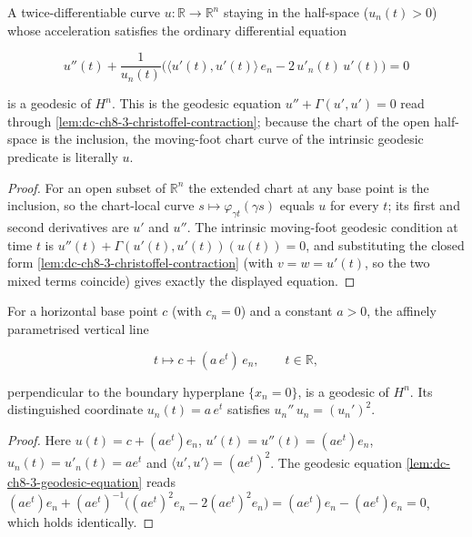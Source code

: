 \begin{lemma}
  \label{lem:dc-ch8-3-geodesic-equation}
  \leanok
  A twice-differentiable curve $u:\mathbb R\to\mathbb R^n$ staying in the
  half-space ($u_n(t)>0$) whose acceleration satisfies the ordinary differential
  equation

  $$
  u''(t)+\frac{1}{u_n(t)}\Big(\langle u'(t),u'(t)\rangle\, e_n-2\,u'_n(t)\,u'(t)\Big)=0
  $$

  is a geodesic of $H^n$. This is the geodesic equation $u''+\Gamma(u',u')=0$ read
  through \cref{lem:dc-ch8-3-christoffel-contraction}; because the chart of the open
  half-space is the inclusion, the moving-foot chart curve of the intrinsic geodesic
  predicate is literally $u$.
\end{lemma}
\begin{proof}
  \leanok
\sketch
  For an open subset of $\mathbb R^n$ the extended chart at any base point is the
  inclusion, so the chart-local curve $s\mapsto\varphi_{\gamma t}(\gamma s)$ equals
  $u$ for every $t$; its first and second derivatives are $u'$ and $u''$. The
  intrinsic moving-foot geodesic condition at time $t$ is
  $u''(t)+\Gamma(u'(t),u'(t))(u(t))=0$, and substituting the closed form
  \cref{lem:dc-ch8-3-christoffel-contraction} (with $v=w=u'(t)$, so the two mixed
  terms coincide) gives exactly the displayed equation.
\end{proof}

\begin{lemma}
  \label{lem:dc-ch8-3-vertical-geodesic}
  \leanok
  For a horizontal base point $c$ (with $c_n=0$) and a constant $a>0$, the affinely
  parametrised vertical line

  $$
  t\longmapsto c+(a\,e^{t})\,e_n,\qquad t\in\mathbb R,
  $$

  perpendicular to the boundary hyperplane $\{x_n=0\}$, is a geodesic of $H^n$. Its
  distinguished coordinate $u_n(t)=a\,e^{t}$ satisfies $u_n''\,u_n=(u_n')^2$.
\end{lemma}
\begin{proof}
  \leanok
\sketch
  Here $u(t)=c+(a e^{t})e_n$, $u'(t)=u''(t)=(a e^{t})e_n$, $u_n(t)=u'_n(t)=a e^{t}$
  and $\langle u',u'\rangle=(a e^{t})^2$. The geodesic equation
  \cref{lem:dc-ch8-3-geodesic-equation} reads
  $(a e^{t})e_n+(a e^{t})^{-1}\big((a e^{t})^2 e_n-2(a e^{t})^2 e_n\big)
  =(a e^{t})e_n-(a e^{t})e_n=0$, which holds identically.
\end{proof}

